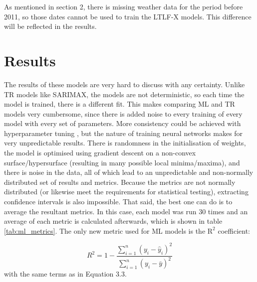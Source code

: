 \documentclass[12pt]{scrreprt}
\begin{document}
As mentioned in section 2, there is missing weather data for the period before 2011, so those dates cannot be used to train the LTLF-X models. This difference will be reflected in the results.

\newpage

\section{Results}

The results of these models are very hard to discuss with any certainty. Unlike TR models like SARIMAX, the models are not deterministic, so each time the model is trained, there is a different fit. This makes comparing ML and TR models very cumbersome, since there is added noise to every training of every model with every set of parameters. More consistency could be achieved with hyperparameter tuning \cite{Gao23}, but the nature of training neural networks makes for very unpredictable results. There is randomness in the initialisation of weights, the model is optimised using gradient descent on a non-convex surface/hypersurface (resulting in many possible local minima/maxima), and there is noise in the data, all of which lead to an unpredictable and non-normally distributed set of results and metrics. Because the metrics are not normally distributed (or likewise meet the requirements for statistical testing), extracting confidence intervals is also impossible. That said, the best one can do is to average the resultant metrics. In this case, each model was run 30 times and an average of each metric is calculated afterwards, which is shown in table \ref{tab:ml_metrics}. The only new metric used for ML models is the $\textrm{R}^2$ coefficient:

\begin{equation}
    R^2 = 1 - \frac{\sum_{i=1}^{n} (y_i - \hat{y}_i)^2}{\sum_{i=1}^{n} (y_i - \bar{y})^2}
\end{equation}
with the same terms as in Equation 3.3.
\end{document}
